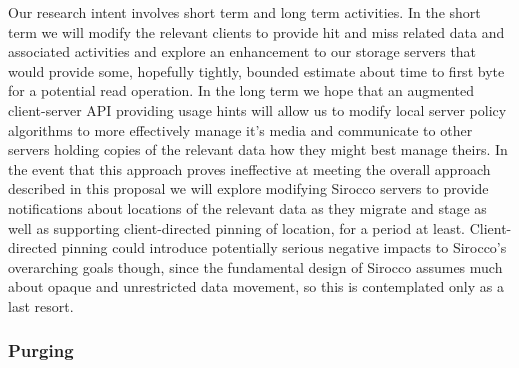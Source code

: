 Our research intent involves short term and long term activities. In the short
term we will modify the relevant clients to provide hit and miss related data
and associated activities and explore an enhancement to our storage servers
that would provide some, hopefully tightly, bounded estimate about time to
first byte for a potential read operation. In the long term we hope that an
augmented client-server API providing usage hints will allow us to modify local
server policy algorithms to more effectively manage it's media and communicate
to other servers holding copies of the relevant data how they might best manage
theirs. In the event that this approach proves ineffective at meeting the
overall approach described in this proposal we will explore modifying Sirocco
servers to provide notifications about locations of the relevant data as they
migrate and stage as well as supporting client-directed pinning of location,
for a period at least. Client-directed pinning could introduce potentially
serious negative impacts to Sirocco's overarching goals though, since the
fundamental design of Sirocco assumes much about opaque and unrestricted data
movement, so this is contemplated only as a last resort.

\subsubsection{Purging}
\label{sec:purging}



